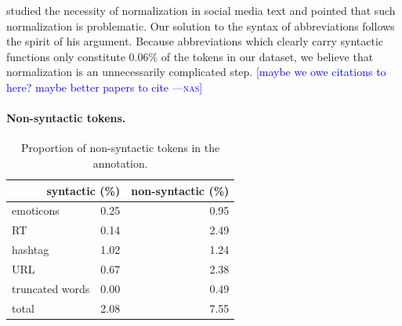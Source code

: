 \documentclass[11pt,a4paper]{article}
\newcommand{\nascomment}[1]{\textcolor{blue}{[#1 ---\textsc{nas}]}}
\begin{document}
\citet{eisenstein:2013:NAACL-HLT} studied the necessity of normalization
in social media text and pointed that such normalization is problematic.
Our solution to the syntax of abbreviations follows the spirit of his argument. Because abbreviations which clearly carry
syntactic functions only constitute 0.06\% of the tokens in our
dataset, we believe that normalization is an unnecessarily complicated step.
\nascomment{maybe we owe citations to
  \cite{finin-EtAl:2010:MTURK,eisenstein:2013:NAACL-HLT} here?  maybe
  better papers to cite}


\paragraph{Non-syntactic tokens.}  
\begin{table}
\centering
\begin{tabular}{lrr}
\multicolumn{2}{r}{syntactic (\%)} & non-syntactic (\%)\\ \hline
emoticons & 0.25 & 0.95 \\
RT & 0.14 & 2.49\\
hashtag & 1.02 & 1.24 \\
URL & 0.67 & 2.38 \\
truncated words & 0.00 & 0.49 \\
 \hline
 total & 2.08 & 7.55 \\
\end{tabular}
\caption{Proportion of non-syntactic tokens in the annotation.}\label{tbl:non-synt-prop}
\end{table}
\end{document}
